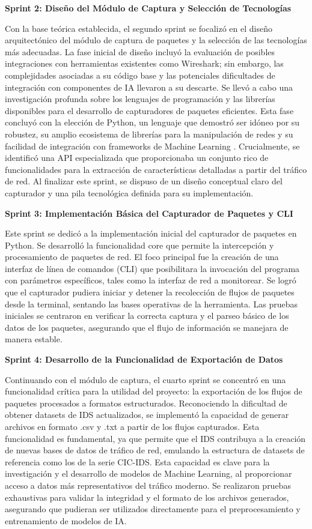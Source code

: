 \textbf{Sprint 2: Diseño del Módulo de Captura y Selección de Tecnologías} 

Con la base teórica establecida, el segundo sprint se focalizó en el diseño arquitectónico del módulo de captura de paquetes y la selección de las tecnologías más adecuadas. La fase inicial de diseño incluyó la evaluación de posibles integraciones con herramientas existentes como Wireshark; sin embargo, las complejidades asociadas a su código base y las potenciales dificultades de integración con componentes de IA llevaron a su descarte. Se llevó a cabo una investigación profunda sobre los lenguajes de programación y las librerías disponibles para el desarrollo de capturadores de paquetes eficientes. Esta fase concluyó con la elección de Python, un lenguaje que demostró ser idóneo por su robustez, su amplio ecosistema de librerías para la manipulación de redes \cite{Shrefler2017Networking} y su facilidad de integración con frameworks de Machine Learning \cite{Pedregosa2011ScikitLearn}. Crucialmente, se identificó una API especializada que proporcionaba un conjunto rico de funcionalidades para la extracción de características detalladas a partir del tráfico de red. Al finalizar este sprint, se dispuso de un diseño conceptual claro del capturador y una pila tecnológica definida para su implementación.

\textbf{Sprint 3: Implementación Básica del Capturador de Paquetes y CLI}

Este sprint se dedicó a la implementación inicial del capturador de paquetes en Python. Se desarrolló la funcionalidad core que permite la intercepción y procesamiento de paquetes de red. El foco principal fue la creación de una interfaz de línea de comandos (CLI) que posibilitara la invocación del programa con parámetros específicos, tales como la interfaz de red a monitorear. Se logró que el capturador pudiera iniciar y detener la recolección de flujos de paquetes desde la terminal, sentando las bases operativas de la herramienta. Las pruebas iniciales se centraron en verificar la correcta captura y el parseo básico de los datos de los paquetes, asegurando que el flujo de información se manejara de manera estable.

\textbf{Sprint 4: Desarrollo de la Funcionalidad de Exportación de Datos}

Continuando con el módulo de captura, el cuarto sprint se concentró en una funcionalidad crítica para la utilidad del proyecto: la exportación de los flujos de paquetes procesados a formatos estructurados. Reconociendo la dificultad de obtener datasets de IDS actualizados, se implementó la capacidad de generar archivos en formato .csv y .txt a partir de los flujos capturados. Esta funcionalidad es fundamental, ya que permite que el IDS contribuya a la creación de nuevas bases de datos de tráfico de red, emulando la estructura de datasets de referencia como los de la serie CIC-IDS. Esta capacidad es clave para la investigación y el desarrollo de modelos de Machine Learning, al proporcionar acceso a datos más representativos del tráfico moderno. Se realizaron pruebas exhaustivas para validar la integridad y el formato de los archivos generados, asegurando que pudieran ser utilizados directamente para el preprocesamiento y entrenamiento de modelos de IA.

